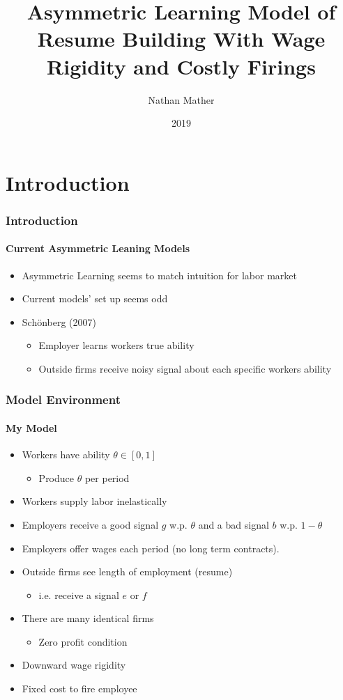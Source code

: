 \documentclass{beamer}
\title{Asymmetric Learning Model of Resume Building With Wage Rigidity and Costly Firings}
\author{Nathan Mather}
\institute{University of Michigan}
\date{2019}
\begin{document}
	
	
	
	\frame{\titlepage}
	
	\section{Introduction}
	
	\begin{frame}
	\frametitle{Introduction}
	
	\framesubtitle{Current Asymmetric Leaning Models}
	\begin{itemize}
		\setlength{\itemsep}{3mm}
		\item Asymmetric Learning seems to match intuition for labor market
		\item Current models' set up seems odd 
		\item Schönberg (2007)
		\begin{itemize}
			\item Employer learns workers true ability 
			\item Outside firms receive noisy signal about each specific workers ability 
		\end{itemize}
	\end{itemize}
\end{frame}


\begin{frame}
\frametitle{Model Environment}
\framesubtitle{My Model}
\begin{itemize}
	\setlength{\itemsep}{1mm}
	\item Workers have ability $\theta \in [0,1]$ 
	\begin{itemize}
		\setlength{\itemsep}{1mm}
		\item Produce $\theta$ per period 		
	\end{itemize}
\item Workers supply labor inelastically
\item Employers receive a good signal $g$ w.p. $\theta$ and a bad signal $b$ w.p. $1-\theta$
\item Employers offer wages each period (no long term contracts).
\item Outside firms see length of employment (resume)
\begin{itemize}
	\setlength{\itemsep}{1mm}
	\item i.e. receive a signal $e$ or $f$ 
\end{itemize}
	\item There are many identical firms
	\begin{itemize}
		\item Zero profit condition
	\end{itemize} 
	\item Downward wage rigidity 
	\item Fixed cost to fire employee

\end{itemize}
\end{frame}
\end{document}
